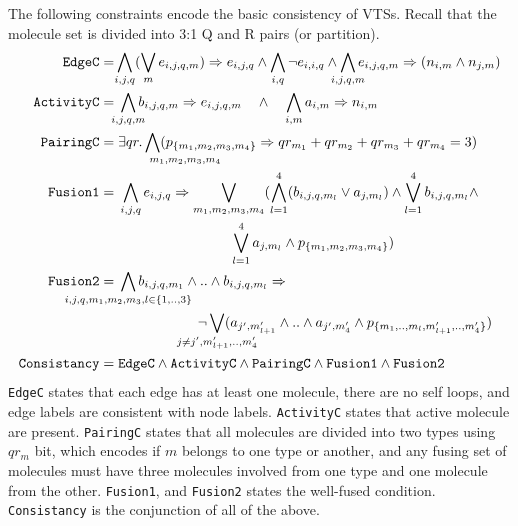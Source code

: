 The following constraints encode the basic consistency of VTSs. 
%
Recall that the molecule set is divided into 3:1 Q and R pairs (or partition).
\begin{align*}
\texttt{EdgeC} =\;&\hspace{-1ex}\bigwedge\limits_{i,j,q} (\bigvee_m e_{i,j,q,m} )\limplies e_{i,j,q}
\land
\bigwedge\limits_{i,q} \neg e_{i,i,q}
\land
\bigwedge\limits_{\mathclap{i,j,q,m}} e_{i,j,q,m} \limplies (n_{i,m} \land n_{j,m} )
\\
\texttt{ActivityC} =\;&
\bigwedge\limits_{\mathclap{i,j,q,m}} b_{i,j,q,m} \limplies e_{i,j,q,m} \quad\land\quad
\bigwedge\limits_{i,m} a_{i,m} \limplies n_{i,m}
\\
\texttt{PairingC} =\;&
\exists qr. \Land\limits_{\mathrlap{m_1,m_2,m_3,m_4}\;\;}
(p_{\{m_1,m_2,m_3,m_4\}} \limplies qr_{m_1} + qr_{m_2} + qr_{m_3} + qr_{m_4} = 3) 
\\
\texttt{Fusion1} =\;&
\bigwedge\limits_{i,j,q} e_{i,j,q} \limplies
\bigvee_{{m_1,m_2,m_3,m_4}} (\Land_{l=1}^4 ( b_{i,j,q,m_l} \lor a_{j,m_l} ) \land 
\Lor\limits_{l=1}^4 b_{i,j,q,m_l} \land\\
& \qquad \qquad \qquad \qquad \Lor\limits_{l=1}^4 a_{j,m_l}\land p_{\{m_1,m_2,m_3,m_4\}})
\\
\texttt{Fusion2} =\;&
\bigwedge\limits_{\mathclap{i,j,q,m_1,m_2,m_3, l \in \{1,..,3\}}} b_{i,j,q,m_1} \land ..\land b_{i,j,q,m_l} \limplies \\
& \hspace{2cm} \neg 
\bigvee_{\mathclap{j \neq j^{\prime}, m_{l+1}^{\prime},..,m_{4}^{\prime}}} ( a_{j^{\prime},m_{l+1}^{\prime}} \land .. \land a_{j^{\prime},m_4^{\prime}} \land p_{\{m_1,..,m_l,m^{\prime}_{l+1},..,m^{\prime}_4\}})
\\
\texttt{Consistancy} =\;& \texttt{EdgeC} \land
\texttt{ActivityC} \land \texttt{PairingC} \land
\texttt{Fusion1} \land \texttt{Fusion2} 
\end{align*}
\texttt{EdgeC} states that each edge has at least one molecule,
there are no self loops, and edge labels are consistent with node labels.   
\texttt{ActivityC} states that active molecule are present.
\texttt{PairingC} states that all molecules are divided into two types
using $qr_m$ bit, which encodes if $m$ belongs to one type or another,
and any fusing set of molecules must have three molecules involved
from one type and one molecule from the other.
\texttt{Fusion1}, and \texttt{Fusion2} states the well-fused condition.
\texttt{Consistancy} is the conjunction of all of the above.

